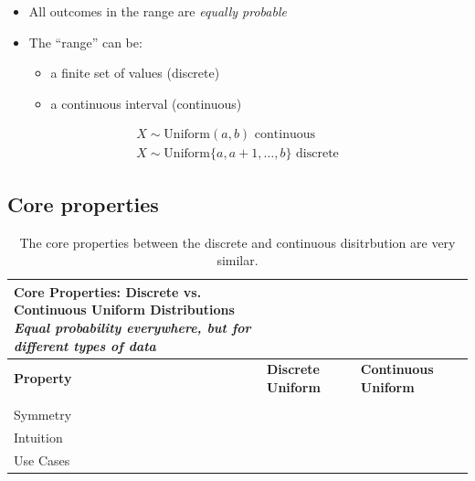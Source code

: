 \documentclass[
  a4paper,
]{scrbook}
\providecommand{\tightlist}{%
  \setlength{\itemsep}{0pt}\setlength{\parskip}{0pt}}\usepackage{longtable,booktabs,array}
\begin{document}
\begin{itemize}
\tightlist
\item
  All outcomes in the range are \emph{equally probable}
\item
  The ``range'' can be:

  \begin{itemize}
  \tightlist
  \item
    a finite set of values (discrete)
  \item
    a continuous interval (continuous)
  \end{itemize}
\end{itemize}

\begin{align}
X \sim \mathrm{Uniform}(a,b) \text{ continuous}\\
X \sim \mathrm{Uniform}\{a,a+1,\ldots,b\} \text{ discrete}
\end{align}

\subsection{Core properties}\label{core-properties}

\begingroup
\fontsize{12.0pt}{14.4pt}\selectfont
\setlength{\LTpost}{0mm}

\begin{longtable}{lll}

\caption{\label{tbl-unif-prop}The core properties between the discrete
and continuous disitrbution are very similar.}

\tabularnewline

\caption*{
{\large \textbf{Core Properties: Discrete vs. Continuous Uniform Distributions}} \\ 
{\small \emph{Equal probability everywhere, but for different types of data}}
} \\ 
\toprule
\textbf{Property} & \textbf{Discrete Uniform} & \textbf{Continuous Uniform} \\ 
\midrule\addlinespace[2.5pt]
{Probability} & {\cellcolor[HTML]{F0F0F0}{Equal for each outcome.}} & {\cellcolor[HTML]{E6F3FF}{Equal density over the interval.}} \\ 
{Symmetry} & {\cellcolor[HTML]{F0F0F0}{Mean = midpoint of the range.}} & {\cellcolor[HTML]{E6F3FF}{Mean = midpoint of the interval.}} \\ 
{Intuition} & {\cellcolor[HTML]{F0F0F0}{`Fair die' with n sides.}} & {\cellcolor[HTML]{E6F3FF}{`Fair spinner' on a line segment.}} \\ 
{Use Cases} & {\cellcolor[HTML]{F0F0F0}{Counting problems (e.g., dice, cards).}} & {\cellcolor[HTML]{E6F3FF}{Measuring problems (e.g., time, space).}} \\ 
\bottomrule

\end{longtable}
\end{document}
